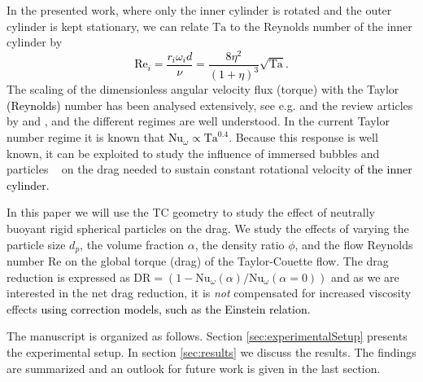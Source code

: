 \documentclass{jfm}
\newcommand\Nus{\text{Nu}}
\newcommand\Tay{\text{Ta}}
\newcommand\rey{\text{Re}}
\newcommand{\red}[1]{\textcolor{black}{#1}}
\begin{document}
In the presented work, where only the inner cylinder is rotated and the outer
cylinder is kept stationary, we can relate $\Tay$ to the Reynolds number of
the inner cylinder by
\red{
\begin{equation}
\rey_i = \frac{r_i \omega_i d}{\nu} = \frac{8\eta^2}{(1+\eta)^{3}} \sqrt{\Tay}.
\end{equation}
}
\noindent The scaling of the dimensionless angular velocity flux (torque) with
the Taylor \red{(Reynolds)} number has been analysed extensively, see e.g.
\cite{Lathrop1992,Lewis1999,Paoletti2011,vanGils2011,Ostilla-Monico2013} and
the review articles by \cite{Fardin2014} and \cite{Grossmann2016}, and the
different regimes are well understood. In the current Taylor number regime it
is known that \red{$\Nus_\omega \propto \Tay^{0.4}$}. Because this response is
well known, it can be exploited to study the influence of immersed bubbles and
particles
~\citep{vandenBerg2005,vandenBerg2007,vanGils2013,Maryami2014,Verschoof2016}
on the drag needed to sustain constant rotational velocity \red{of the inner
cylinder}. 

In this paper we will use the TC geometry to study the effect of neutrally
buoyant rigid spherical particles on the drag. We study the effects of varying
the particle size $d_p$, the volume fraction $\alpha$, the density ratio
$\phi$, and the flow Reynolds number $\text{Re}$ on the global torque (drag)
of the Taylor-Couette flow. The drag reduction is expressed as $\text{DR} =
\left(1 - \Nus_\omega(\alpha) / \Nus_\omega(\alpha=0) \right)$ and as we are
interested in the net drag reduction, it is \emph{not} compensated for
increased viscosity effects \red{using correction models, such as the Einstein
relation}.

The manuscript is organized as follows. Section \ref{sec:experimentalSetup}
presents the experimental setup. In section \ref{sec:results} we discuss the
results. The findings are summarized and an outlook for future work is given
in the last section.
\end{document}
